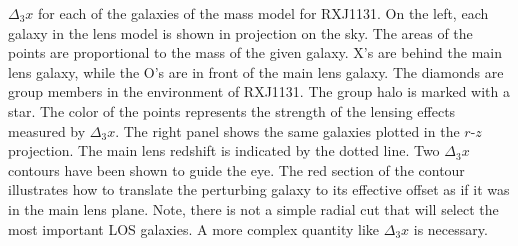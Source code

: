 \label{fig:fieldrz} $\Delta_3x$ for each of the galaxies of the mass model for RXJ1131. On the left, each galaxy in the lens model is shown in projection on the sky. The areas of the points are proportional to the mass of the given galaxy. X's are behind the main lens galaxy, while the O's are in front of the main lens galaxy. The diamonds are group members in the environment of RXJ1131. The group halo is marked with a star. The color of the points represents the strength of the lensing effects measured by $\Delta_3 x$. The right panel shows the same galaxies plotted in the $r$-$z$ projection. The main lens redshift is indicated by the dotted line. Two $\Delta_3 x$ contours have been shown to guide the eye. The red section of the contour illustrates how to translate the perturbing galaxy to its effective offset as if it was in the main lens plane. Note, there is not a simple radial cut that will select the most important LOS galaxies. A more complex quantity like $\Delta_3 x$ is necessary.